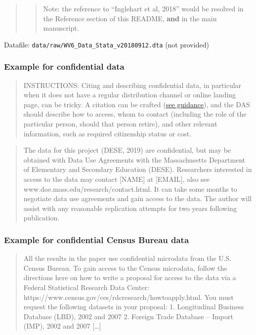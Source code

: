 \documentclass[
]{article}
\begin{document}
\begin{quote}
\begin{quote}
Note: the reference to ``Inglehart et al, 2018'' would be resolved in
the Reference section of this README, \textbf{and} in the main
manuscript.
\end{quote}
\end{quote}

Datafile: \texttt{data/raw/WV6\_Data\_Stata\_v20180912.dta} (not
provided)

\hypertarget{example-for-confidential-data}{%
\subsubsection{Example for confidential
data}\label{example-for-confidential-data}}

\begin{quote}
INSTRUCTIONS: Citing and describing confidential data, in particular
when it does not have a regular distribution channel or online landing
page, can be tricky. A citation can be crafted
(\href{https://social-science-data-editors.github.io/guidance/FAQ.html\#data-citation-without-online-link}{see
guidance}), and the DAS should describe how to access, whom to contact
(including the role of the particular person, should that person
retire), and other relevant information, such as required citizenship
status or cost.
\end{quote}

\begin{quote}
The data for this project (DESE, 2019) are confidential, but may be
obtained with Data Use Agreements with the Massachusetts Department of
Elementary and Secondary Education (DESE). Researchers interested in
access to the data may contact {[}NAME{]} at {[}EMAIL{]}, also see
www.doe.mass.edu/research/contact.html. It can take some months to
negotiate data use agreements and gain access to the data. The author
will assist with any reasonable replication attempts for two years
following publication.
\end{quote}

\hypertarget{example-for-confidential-census-bureau-data}{%
\subsubsection{Example for confidential Census Bureau
data}\label{example-for-confidential-census-bureau-data}}

\begin{quote}
All the results in the paper use confidential microdata from the U.S.
Census Bureau. To gain access to the Census microdata, follow the
directions here on how to write a proposal for access to the data via a
Federal Statistical Research Data Center:
https://www.census.gov/ces/rdcresearch/howtoapply.html. You must request
the following datasets in your proposal: 1. Longitudinal Business
Database (LBD), 2002 and 2007 2. Foreign Trade Database -- Import (IMP),
2002 and 2007 {[}\ldots{]}
\end{quote}
\end{document}
